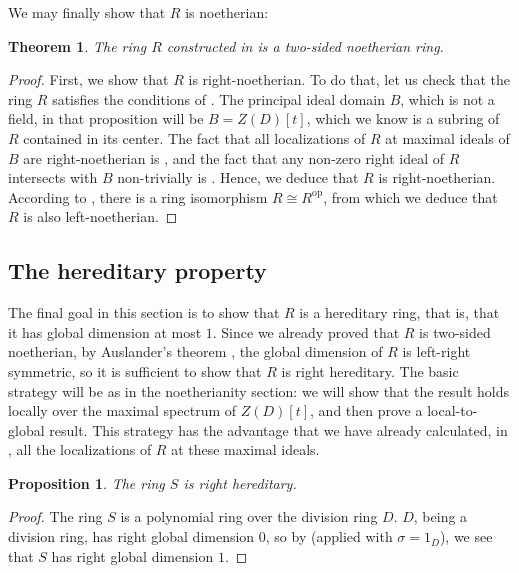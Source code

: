 \documentclass{amsart}
\newtheorem{thm}[equation]{Theorem}
\newtheorem{prop}[equation]{Proposition}
\theoremstyle{definition}
\newcommand{\opn}{\operatorname}
\numberwithin{equation}{section}
\begin{document}
We may finally show that $R$ is noetherian:

\begin{thm}\label{thm:noetherian}
The ring $R$ constructed in  is a two-sided noetherian ring.
\end{thm}
\begin{proof}
First, we show that $R$ is right-noetherian.
To do that, let us check that the ring $R$ satisfies the conditions of .
The principal ideal domain $B$, which is not a field, in that proposition will be $B = Z(D)[t]$,
which we know is a subring of $R$ contained in its center.
The fact that all localizations of $R$ at maximal ideals of $B$ are right-noetherian is ,
and the fact that any non-zero right ideal of $R$ intersects with $B$ non-trivially is .
Hence, we deduce that $R$ is right-noetherian.
According to ,
there is a ring isomorphism $R \cong R^{\opn{op}}$,
from which we deduce that $R$ is also left-noetherian.
\end{proof}

\subsection{The hereditary property}

The final goal in this section is to show that $R$ is a hereditary ring,
that is, that it has global dimension at most $1$.
Since we already proved that $R$ is two-sided noetherian,
by Auslander's theorem \cite[Corollary 5]{Aus}, the global dimension of $R$ is left-right symmetric, so it is sufficient to show that $R$ is right hereditary.
The basic strategy will be as in the noetherianity section:
we will show that the result holds locally over the maximal spectrum of $Z(D)[t]$, and then prove a local-to-global result.
This strategy has the advantage that we have already calculated, in , all the localizations of $R$ at these maximal ideals.

\begin{prop}\label{prop:shere}
The ring $S$ is right hereditary.
\end{prop}
\begin{proof}
The ring $S$ is a polynomial ring over the division ring $D$.
$D$, being a division ring, has right global dimension $0$,
so by \cite[Theorem 7.5.3(iii)]{NCBook} (applied with $\sigma = 1_D$),
we see that $S$ has right global dimension $1$.
\end{proof}
\end{document}
